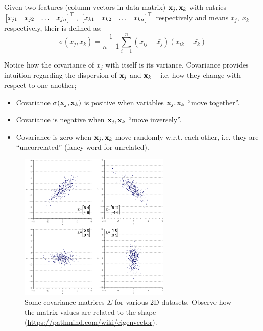 \documentclass[a4paper]{article}
\begin{document}
\begin{definition}[covariance]
Given two features (column vectors in data matrix) $\textbf{x}_j,\textbf{x}_k$ with entries $\begin{bmatrix}x_{j1} & x_{j2} & \ldots & x_{jn}  \end{bmatrix}^{\top}$, $\begin{bmatrix}x_{k1} & x_{k2} & \ldots & x_{kn}  \end{bmatrix}^{\top}$ respectively and means $\bar{x_j},\ \bar{x_k}$ respectively, their  is defined as:
\begin{equation}
    \sigma(x_j,x_k) = \frac{1}{n-1}\sum\limits_{i=1}^{n}(x_{ij} - \bar{x_j})(x_{ik} - \bar{x_k})
\end{equation}
\end{definition}
Notice how the covariance of $x_j$ with itself is its variance. Covariance provides intuition regarding the dispersion of $\textbf{x}_j$ and $\textbf{x}_k$ -- i.e. how they change with respect to one another;
\begin{itemize}
    \item Covariance $\sigma(\textbf{x}_j,\textbf{x}_k)$ is positive when variables $\textbf{x}_j,\textbf{x}_k$ ``move together''.
    \item Covariance is negative when $\textbf{x}_j,\textbf{x}_k$ ``move inversely''.
    \item Covariance is zero when $\textbf{x}_j,\textbf{x}_k$ move randomly w.r.t. each other, i.e. they are ``uncorrelated'' (fancy word for unrelated).
\end{itemize}
\begin{figure}[H]
    \centering
    \includegraphics[height=7cm]{img/covariance_matrices_2d_points.png}
    \caption{Some covariance matrices $\Sigma$ for various 2D datasets. Observe how the matrix values are related to the shape  (\url{https://pathmind.com/wiki/eigenvector}).}
    \label{fig:my_label}
\end{figure}
\end{document}
